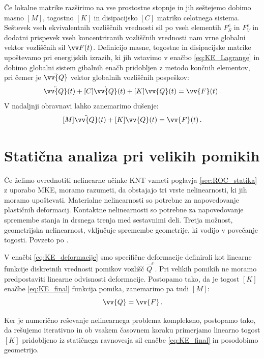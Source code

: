         Če lokalne matrike razširimo na vse prostostne stopnje in jih seštejemo dobimo masno $[M]$, togostno $[K]$ in disipacijsko $[C]$ matriko celotnega sistema. Seštevek vseh ekvivalentnih vozliščnih vrednosti sil po vseh elementih $F_S^e$ in $F_V^e$  in dodatni prispevek vseh koncentriranih vozliščnih vrednosti nam vrne globalni vektor vozliščnih sil $\vv F(t)$. Definicijo masne, togostne in disipacijske matrike upoštevamo pri energijskih izrazih, ki jih vstavimo v enačbo \eqref{eq:KE_Lagrange} in dobimo globalni sistem gibalnih enačb pridobljen z metodo končnih elementov, pri čemer je $\ddot{\vv{Q}}$ vektor globalnih vozliščnih pospeškov:
        \begin{equation}
            [M] \ddot{\vv{Q}}(t)+[C] \dot{\vv{Q}}(t)+[K] \vv{Q}(t)=\vv{F}(t) \,.
        \end{equation}
        V nadaljnji obravnavi lahko zanemarimo dušenje:
        \begin{equation}\label{eq:KE_final}
            [M] \ddot{\vv{Q}}(t)+ [K] \vv{Q}(t)=\vv{F}(t) \,.
        \end{equation}

    \section{Statična analiza pri velikih pomikih}

        Če želimo ovrednotiti nelinearne učinke KNT vzmeti poglavja \ref{sec:ROC_statika} z uporabo MKE, moramo razumeti, da obstajajo tri vrste nelinearnosti, ki jih moramo upoštevati. Materialne nelinearnosti so potrebne za napovedovanje plastičnih deformacij. Kontaktne nelinearnosti so potrebne za napovedovanje spremembe stanja in drsnega trenja med sestavnimi deli. Tretja možnost, geometrijska nelinearnost, vključuje spremembe geometrije, ki vodijo v povečanje togosti. Povzeto po \cite{Crisfield2000}.

        V enačbi \eqref{eq:KE_deformacije} smo specifične deformacije definirali kot linearne funkcije diskretnih vrednosti pomikov vozlišč $\vec Q^e$. Pri velikih pomikih ne moramo predpostaviti linearne odvisnosti deformacije. Postopamo tako, da je togost $[K]$ enačbe \eqref{eq:KE_final} funkcija pomika, zanemarimo pa tudi $[M]$:
        \begin{equation}
            [K(\vv Q)] \, \vv{Q}=\vv{F} \,.
        \end{equation}

        Ker je numerično reševanje nelinearnega problema kompleksno, postopamo tako, da rešujemo iterativno in ob vsakem časovnem koraku primerjamo linearno togost $[K]$ pridobljeno iz statičnega ravnovesja sil enačbe \eqref{eq:KE_final}  in posodobimo geometrijo. 

